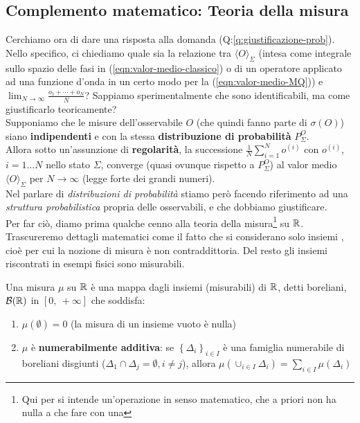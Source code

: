 \documentclass[FisicaTeorica.tex]{subfiles}
\begin{document}
\subsection{Complemento matematico: Teoria della misura}
Cerchiamo ora di dare una risposta alla domanda (Q:\ref{q:giustificazione-prob}). Nello specifico, ci chiediamo quale sia la relazione tra $\langle O \rangle_\Sigma$ (intesa come integrale sullo spazio delle fasi in \textit{\MC} (\ref{eqn:valor-medio-classico}) o di un operatore applicato ad una funzione d'onda in un certo modo per la \textit{\MQ} (\ref{eqn:valor-medio-MQ})) e $\lim_{N\to\infty} \frac{o_1 + \cdots + o_N}{N}$? Sappiamo sperimentalmente che sono identificabili, ma come giustificarlo teoricamente?\\
Supponiamo che le misure dell'osservabile $O$ (che quindi fanno parte di $\sigma(O)$) siano \textbf{indipendenti} e con la stessa \textbf{distribuzione di probabilità} $P_\Sigma^O$.\\
Allora sotto un'assunzione di \textbf{regolarità}, la successione $\frac{1}{N}\sum_{i=1}^{N}o^{\left(i\right)}$ con $o^{(i)}$, $i=1\dots N$ nello stato $\Sigma$, converge (quasi ovunque rispetto a $P_\Sigma^O$) al valor medio $\langle O \rangle_\Sigma$  per $N\to\infty$ (legge forte dei grandi numeri).\\
Nel parlare di \textit{distribuzioni di probabilità} stiamo però facendo riferimento ad una \textit{struttura probabilistica} propria delle osservabili, e che dobbiamo giustificare.\\
Per far ciò, diamo prima qualche cenno alla teoria della misura\footnote{Qui per  si intende un'operazione in senso matematico, che a priori non ha nulla a che fare con una } su $\mathbb{R}$.\\
Trascureremo dettagli matematici come il fatto che si considerano solo insiemi , cioè per cui la nozione di misura è non contraddittoria. Del resto  gli insiemi riscontrati in esempi fisici sono misurabili.\\
\begin{dfn}
Una misura $\mu$ su $\mathbb{R}$ è una mappa dagli insiemi (misurabili) di $\mathbb{R}$, detti boreliani, $\mathcal{B}(\mathbb{R})$ in $\left[0,\ +\infty\right]$ che soddisfa:
\begin{enumerate}
    \item $\mu \left(\emptyset\right)=0$ (la misura di un insieme vuoto è nulla)
    \item $\mu$ è \textbf{numerabilmente additiva}: se $\left\{\Delta_i\right\}_{i\in I}$ è una famiglia numerabile di boreliani disgiunti ($\Delta_1 \cap \Delta_j=\emptyset, i\neq j$), allora $\mu\left(\cup_{i\in I}\Delta_i\right)= \sum_{i\in I}\mu\left(\Delta_i\right)$
\end{enumerate}
\end{dfn}
\end{document}
